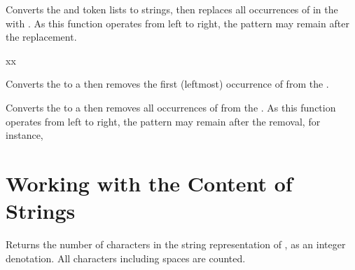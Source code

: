 \documentclass[oneside]{book}
\begin{document}
\begin{function}{\strVarReplaceAll}
\begin{syntax}
   
\end{syntax}
Converts the  and  token lists to strings, then
replaces all occurrences of  in the
 with .
As this function
operates from left to right, the pattern 
may remain after the replacement.
\begin{demohigh}
\strSet {}
\strVarReplaceAll {} {xx}
\strUse \lTmpaStr
\end{demohigh}
\end{function}

\begin{function}{\strVarRemoveOnce}
\begin{syntax}
  
\end{syntax}
Converts the  to a  then
removes the first (leftmost) occurrence of  from the .
\begin{demohigh}
\strSet {}
\strVarRemoveOnce {}
\strUse \lTmpaStr
\end{demohigh}
\end{function}

\begin{function}{\strVarRemoveAll}
\begin{syntax}
  
\end{syntax}
Converts the  to a  then
removes all occurrences of  from the .
As this function operates from left to right,
the pattern  may remain after the removal, for instance,
\begin{demohigh}
\strSet {}
\strVarRemoveAll {}
\tlUse \lTmpaStr
\end{demohigh}
\end{function}

\section{Working with the Content of Strings}

\begin{function}{\strCount}
\begin{syntax}
 
\end{syntax}
Returns the number of characters in the string representation of ,
as an integer denotation. All characters including spaces are counted.
\begin{demohigh}
\end{demohigh}
\end{function}
\end{document}
